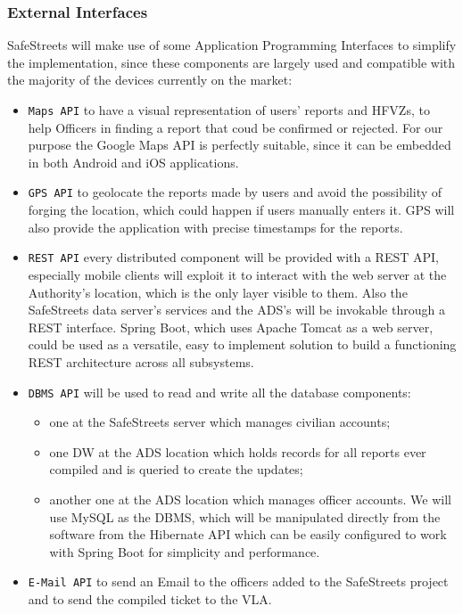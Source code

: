 \documentclass[12pt,a4paper]{article}
\begin{document}
\subsubsection{External Interfaces}
SafeStreets will make use of some Application Programming Interfaces to simplify the implementation, since these components are largely used and compatible with the majority of the devices currently on the market:
\begin{itemize}
\item \texttt{Maps API} to have a visual representation of users' reports and HFVZs, to help Officers in finding a report that coud be confirmed or rejected. For our purpose the Google Maps API is perfectly suitable, since it can be embedded in both Android and iOS applications.
\item \texttt{GPS API} to geolocate the reports made by users and  avoid the possibility of forging the location, which could happen if users manually enters it. GPS will also provide the application with precise timestamps for the reports.
\item \texttt{REST API} every distributed component will be provided with a REST API, especially mobile clients will exploit it to interact with the web server at the Authority's location, which is the only layer visible to them. Also the SafeStreets data server's services and the ADS's will be invokable through a REST interface. Spring Boot, which uses Apache Tomcat as a web server, could be used as a versatile, easy to implement solution to build a functioning REST architecture across all subsystems.
\item \texttt{DBMS API} will be used to read and write all the database components:
\begin{itemize}
\item one at the SafeStreets server which manages civilian accounts;
\item one DW at the ADS location which holds records for all reports ever compiled and is queried to create the updates;
\item another one at the ADS location which manages officer accounts.
We will use MySQL as the DBMS, which will be manipulated directly from the software from the Hibernate API which can be easily configured to work with Spring Boot for simplicity and performance.
\end{itemize}
\item \texttt{E-Mail API} to send an Email to the officers added to the SafeStreets project and to send the compiled ticket to the VLA. 
\end{itemize}
\end{document}

